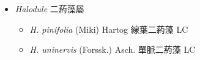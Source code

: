 
  \begin{itemize}
 \item[] \textit{Halodule} 二葯藻屬
                                
  \begin{itemize}
        \item[] \textit{H. pinifolia} (Miki) Hartog  線葉二葯藻   LC
        \item[] \textit{H. uninervis} (Forssk.) Asch.  單脈二葯藻   LC
  \end{itemize}
  \end{itemize}
